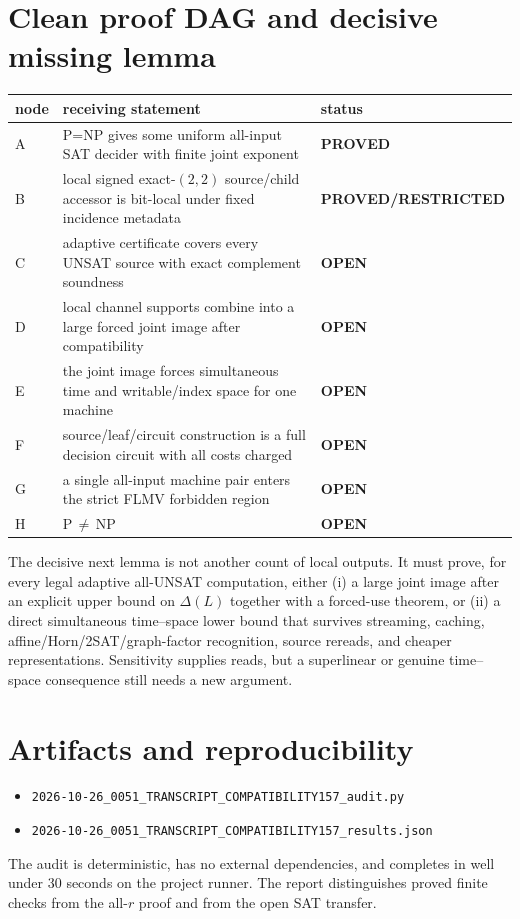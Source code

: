 \documentclass[11pt]{article}
\newcommand{\status}[1]{\textbf{#1}}
\begin{document}
\section*{Clean proof DAG and decisive missing lemma}
\begin{center}
\begin{tabularx}{0.96\linewidth}{@{}lXl@{}}
\toprule
node & receiving statement & status\\
\midrule
A & P=NP gives some uniform all-input SAT decider with finite joint exponent & \status{PROVED}\\
B & local signed exact-$(2,2)$ source/child accessor is bit-local under fixed incidence metadata & \status{PROVED/RESTRICTED}\\
C & adaptive certificate covers every UNSAT source with exact complement soundness & \status{OPEN}\\
D & local channel supports combine into a large forced joint image after compatibility & \status{OPEN}\\
E & the joint image forces simultaneous time and writable/index space for one machine & \status{OPEN}\\
F & source/leaf/circuit construction is a full decision circuit with all costs charged & \status{OPEN}\\
G & a single all-input machine pair enters the strict FLMV forbidden region & \status{OPEN}\\
H & P\,$\ne$\,NP & \status{OPEN}\\
\bottomrule
\end{tabularx}
\end{center}
The decisive next lemma is not another count of local outputs.  It must prove,
for every legal adaptive all-UNSAT computation, either (i) a large joint image
after an explicit upper bound on $\Delta(L)$ together with a forced-use theorem,
or (ii) a direct simultaneous time--space lower bound that survives streaming,
caching, affine/Horn/2SAT/graph-factor recognition, source rereads, and cheaper
representations.  Sensitivity supplies reads, but a superlinear or genuine
time--space consequence still needs a new argument.

\section*{Artifacts and reproducibility}
\begin{itemize}
  \item \texttt{2026-10-26\_0051\_TRANSCRIPT\_COMPATIBILITY157\_audit.py}
  \item \texttt{2026-10-26\_0051\_TRANSCRIPT\_COMPATIBILITY157\_results.json}
\end{itemize}
The audit is deterministic, has no external dependencies, and completes in
well under 30 seconds on the project runner.  The report distinguishes proved
finite checks from the all-$r$ proof and from the open SAT transfer.

\end{document}
